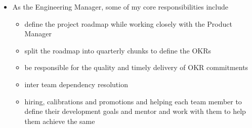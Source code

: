 \documentclass[11pt,a4paper,sans]{moderncv} %
\begin{document}
{\begin{itemize}
            \item As the Engineering Manager, some of my core responsibilities include
            \begin{itemize}
              \item define the project roadmap while working closely with the Product Manager
              \item split the roadmap into quarterly chunks to define the OKRs
              \item be responsible for the quality and timely delivery of OKR commitments
              \item inter team dependency resolution
              \item hiring, calibrations and promotions and helping each team member to define their development goals and mentor and work with them to help them achieve the same
            \end{itemize}
          \end{itemize}}

\newpage{}
\end{document}
